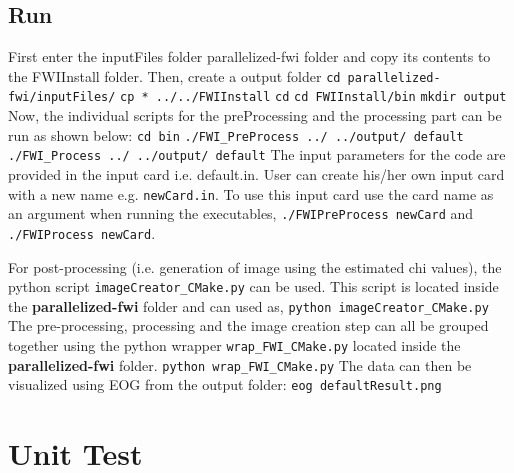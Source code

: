 \documentclass[10pt]{article}
\begin{document}
\subsection{Run}
First enter the inputFiles folder parallelized-fwi folder and copy its contents to the FWIInstall folder. Then, create a output folder  
\newline
\texttt{cd parallelized-fwi/inputFiles/} 
\newline
\texttt{cp * ../../FWIInstall}
\newline
\texttt{cd}
\newline
\texttt{cd FWIInstall/bin}
\newline
\texttt{mkdir output}
\newline
Now, the individual scripts for the preProcessing and the processing part can be run as shown below:
\newline
\texttt{cd bin}
\newline
\texttt{./FWI\_PreProcess ../ ../output/ default}
\newline
\texttt{./FWI\_Process ../ ../output/ default}
\newline
The input parameters for the code are provided in the input card i.e. default.in. User can create his/her own input card with a new name e.g. \texttt{newCard.in}. To use this input card use the card name as an argument when running the executables, \texttt{./FWIPreProcess newCard} and \texttt{./FWIProcess newCard}.

\newpage
\noindent For post-processing (i.e. generation of image using the estimated chi values), the python script \texttt{imageCreator\_CMake.py} can be used. This script is located inside the \textbf{parallelized-fwi} folder and can used as,
\newline
\texttt{python imageCreator\_CMake.py}
\newline
The pre-processing, processing and the image creation step can all be grouped together using the python wrapper \texttt{wrap\_FWI\_CMake.py} located inside the \textbf{parallelized-fwi} folder.
\newline
\texttt{python wrap\_FWI\_CMake.py}
\newline
The data can then be visualized using EOG from the output folder:
\newline
\texttt{eog defaultResult.png}
\newline
 \section{Unit Test}
\end{document}
